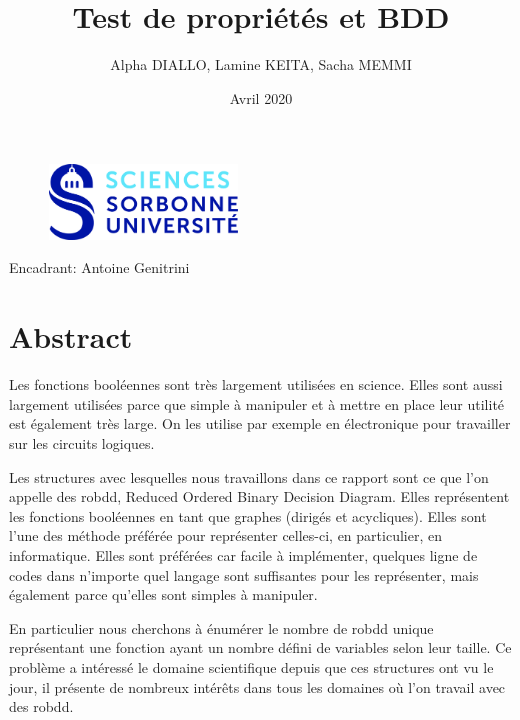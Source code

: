 \documentclass[french]{article}
\title{Test de propriétés et BDD}
\author{Alpha DIALLO, Lamine KEITA, Sacha MEMMI}
\date{Avril 2020}
\begin{document}
\maketitle
\begin{figure}[htp]
    \centering
    \includegraphics[width=5cm, height=2cm]{logo_upmc}
    \label{fig:logo}
\end{figure}

\begin{large}
\begin{center}
    Encadrant: Antoine Genitrini
\end{center}
\vfill
\begin{flushright}
\medskip

\medskip

\medskip

\end{flushright}
\end{large}


\newpage
\tableofcontents
\newpage
\section{Abstract}

Les fonctions booléennes sont très largement utilisées en science. Elles sont aussi largement utilisées parce que simple à manipuler et à mettre en place leur utilité est également très large. On les utilise par exemple en électronique pour travailler sur les circuits logiques.
\vspace{5mm} 

Les structures avec lesquelles nous travaillons dans ce rapport sont ce que l'on appelle des robdd, Reduced Ordered Binary Decision Diagram. Elles représentent les fonctions booléennes en tant que graphes (dirigés et acycliques). Elles sont l'une des méthode préférée pour représenter celles-ci, en particulier, en informatique. Elles sont préférées car facile à implémenter, quelques ligne de codes dans n'importe quel langage sont suffisantes pour les représenter, mais également parce qu'elles sont simples à manipuler.
\vspace{5mm} 

En particulier nous cherchons à énumérer le nombre de robdd unique représentant une fonction ayant un nombre défini de variables selon leur taille. Ce problème a intéressé le domaine scientifique depuis que ces structures ont vu le jour, il présente de nombreux intérêts dans tous les domaines où l'on travail avec des robdd.
\vspace{5mm} 
\end{document}
